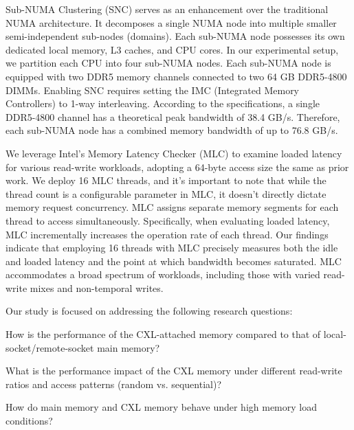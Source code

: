  Sub-NUMA Clustering (SNC) serves as an enhancement over the traditional NUMA architecture. It decomposes a single NUMA node into multiple smaller semi-independent sub-nodes (domains). Each sub-NUMA node possesses its own dedicated local memory, L3 caches, and CPU cores. In our experimental setup, we partition each CPU into four sub-NUMA nodes. Each sub-NUMA node is equipped with two DDR5 memory channels connected to two 64 GB DDR5-4800 DIMMs. Enabling SNC requires setting the IMC (Integrated Memory Controllers) to 1-way interleaving. According to the specifications, a single DDR5-4800 channel has a theoretical peak bandwidth of 38.4 GB/s. Therefore, each sub-NUMA node has a combined memory bandwidth of up to 76.8 GB/s.

 We leverage Intel's Memory Latency Checker (MLC) to examine loaded latency for various read-write workloads, adopting a 64-byte access size the same as prior work. We deploy 16 MLC threads, and it’s important to note that while the thread count is a configurable parameter in MLC, it doesn’t directly dictate memory request concurrency. MLC assigns separate memory segments for each thread to access simultaneously. Specifically, when evaluating loaded latency, MLC incrementally increases the operation rate of each thread. Our findings indicate that employing 16 threads with MLC precisely measures both the idle and loaded latency and the point at which bandwidth becomes saturated. MLC accommodates a broad spectrum of workloads, including those with varied read-write mixes and non-temporal writes.

Our study is focused on addressing the following research questions:

\begin{icompact} \item How is the performance of the CXL-attached memory compared to that of local-socket/remote-socket main memory? \item What is the performance impact of the CXL memory under different read-write ratios and access patterns (random vs. sequential)? \item How do main memory and CXL memory behave under high memory load conditions? \end{icompact}

